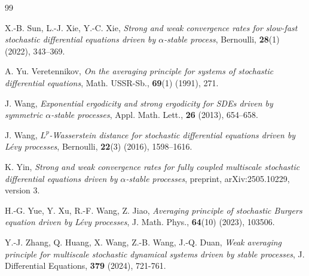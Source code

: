 \documentclass[11pt,reqno]{amsart}
\numberwithin{equation}{section}
\begin{document}
\begin{thebibliography}{99}
	
	 X.-B. Sun, L.-J. Xie, Y.-C. Xie, \textit{Strong and weak convergence rates for slow-fast stochastic differential equations driven by $\alpha$-stable process}, Bernoulli, \textbf{28}(1) (2022), 343–369.
	
	 A. Yu. Veretennikov, \textit{On the averaging principle for systems of stochastic differential equations}, Math. USSR-Sb., \textbf{69}(1) (1991), 271.
	
	 J. Wang, \textit{Exponential ergodicity and strong ergodicity for SDEs driven by symmetric $\alpha$-stable processes}, Appl. Math. Lett., \textbf{26} (2013), 654–658.
	
	 J. Wang, \textit{$L^p$-Wasserstein distance for stochastic differential equations driven by Lévy processes}, Bernoulli, \textbf{22}(3) (2016), 1598–1616.
	
	
	 K. Yin, \textit{Strong and weak convergence rates for fully coupled multiscale stochastic differential equations driven by $\alpha$-stable processes}, preprint, arXiv:2505.10229, version 3.
	
	 H.-G. Yue, Y. Xu, R.-F. Wang, Z. Jiao, \textit{Averaging principle of stochastic Burgers equation driven by Lévy processes}, J. Math. Phys., \textbf{64}(10) (2023), 103506.
	
	 Y.-J. Zhang, Q. Huang, X. Wang, Z.-B. Wang, J.-Q. Duan, \textit{Weak averaging principle for multiscale stochastic dynamical systems driven by stable processes}, J. Differential Equations, \textbf{379} (2024), 721-761. 
	




\end{thebibliography}
\end{document}
